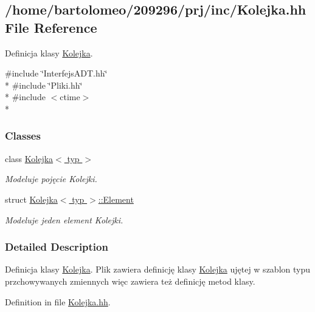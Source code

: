 \hypertarget{_kolejka_8hh}{\subsection{/home/bartolomeo/209296/prj/inc/\-Kolejka.hh File Reference}
\label{_kolejka_8hh}
}


Definicja klasy \hyperlink{class_kolejka}{Kolejka}.  


{\ttfamily \#include \char`\"{}Interfejs\-A\-D\-T.\-hh\char`\"{}}\\*
{\ttfamily \#include \char`\"{}Pliki.\-hh\char`\"{}}\\*
{\ttfamily \#include $<$ctime$>$}\\*
\subsubsection*{Classes}
\begin{DoxyCompactItemize}
\item 
class \hyperlink{class_kolejka}{Kolejka$<$ typ $>$}
\begin{DoxyCompactList}\small\item\em Modeluje pojęcie Kolejki. \end{DoxyCompactList}\item 
struct \hyperlink{struct_kolejka_1_1_element}{Kolejka$<$ typ $>$\-::\-Element}
\begin{DoxyCompactList}\small\item\em Modeluje jeden element Kolejki. \end{DoxyCompactList}\end{DoxyCompactItemize}


\subsubsection{Detailed Description}
Definicja klasy \hyperlink{class_kolejka}{Kolejka}. Plik zawiera definicję klasy \hyperlink{class_kolejka}{Kolejka} ujętej w szablon typu przchowywanych zmiennych więc zawiera też definicję metod klasy. 

Definition in file \hyperlink{_kolejka_8hh_source}{Kolejka.\-hh}.

